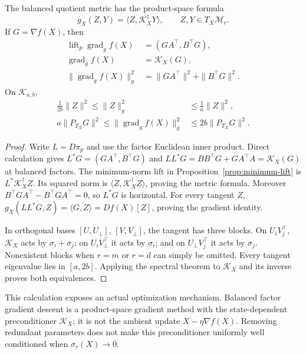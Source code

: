 \begin{theorem}
\label{thm:metric-explicit}
The balanced quotient metric has the product-space formula
\begin{equation}
 g_X(Z,Y)=\langle Z,\mathcal K_X^{\dagger}Y\rangle,
 \qquad Z,Y\in T_X\mathcal M_r.
 \label{eq:explicit-metric}
\end{equation}
If $G=\nabla f(X)$, then
\begin{align}
 \operatorname{lift}_p\operatorname{grad}_g f(X)&=(GA^\top,B^\top G),\\
 \operatorname{grad}_g f(X)&=\mathcal K_X(G),\label{eq:true-gradient}\\
 \|\operatorname{grad}_g f(X)\|_g^2&=\|GA^\top\|^2+\|B^\top G\|^2.
 \label{eq:true-grad-norm}
\end{align}
On $\mathcal K_{a,b}$,
\begin{align}
 \frac{1}{2b}\|Z\|^2\leq\|Z\|_g^2&\leq\frac1a\|Z\|^2,
 \label{eq:metric-equivalence}\\
 a\|P_{T_X}G\|^2\leq\|\operatorname{grad}_g f(X)\|_g^2
 &\leq2b\|P_{T_X}G\|^2.
 \label{eq:gradient-equivalence}
\end{align}
\end{theorem}
\begin{proof}
Write $L=D\pi_p$ and use the factor Euclidean inner product. Direct
calculation gives $L^*G=(GA^\top,B^\top G)$ and
$LL^*G=BB^\top G+GA^\top A=\mathcal K_X(G)$ at balanced factors.
The minimum-norm lift in Proposition~\ref{prop:minimum-lift} is
$L^*\mathcal K_X^\dagger Z$. Its squared norm is
$\langle Z,\mathcal K_X^\dagger Z\rangle$, proving the metric formula.
Moreover $B^\top GA^\top-B^\top GA^\top=0$, so $L^*G$ is horizontal.
For every tangent $Z$,
$g_X(LL^*G,Z)=\langle G,Z\rangle=Df(X)[Z]$, proving the gradient identity.

In orthogonal bases $[U,U_\perp]$, $[V,V_\perp]$, the tangent has three
blocks. On $U_iV_j^\top$, $\mathcal K_X$ acts by
$\sigma_i+\sigma_j$; on $U_iV_\perp^\top$ it acts by $\sigma_i$; and
on $U_\perp V_j^\top$ it acts by $\sigma_j$. Nonexistent blocks when
$r=m$ or $r=d$ can simply be omitted. Every tangent eigenvalue lies in
$[a,2b]$. Applying the spectral theorem to $\mathcal K_X$ and its
inverse proves both equivalences.
\end{proof}

This calculation exposes an actual optimization mechanism. Balanced factor
gradient descent is a product-space gradient method with the
state-dependent preconditioner $\mathcal K_X$; it is not the ambient
update $X-\eta\nabla f(X)$. Removing redundant parameters does not make
this preconditioner uniformly well conditioned when $\sigma_r(X)\to0$.

